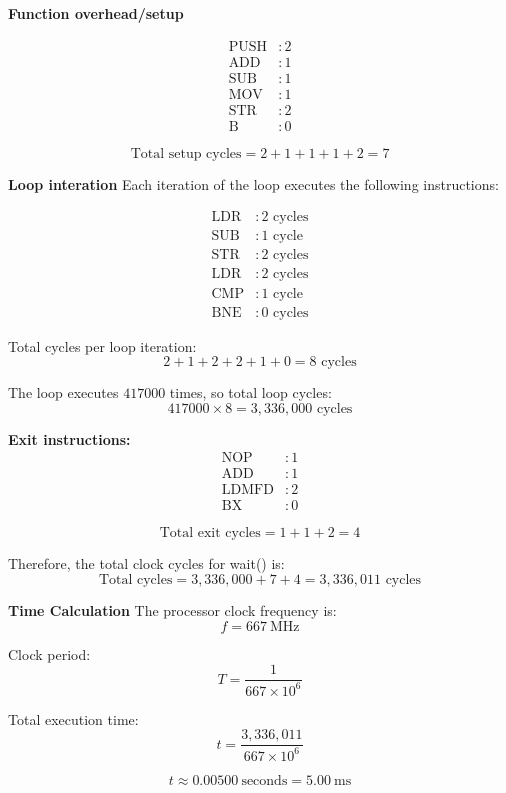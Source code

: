 \documentclass[10pt,twocolumn]{article}
\begin{document}
\textbf{Function overhead/setup}

\begin{align*}
\text{PUSH} &: 2 \\
\text{ADD}  &: 1 \\
\text{SUB}  &: 1 \\
\text{MOV}  &: 1 \\
\text{STR}  &: 2 \\
\text{B}    &: 0
\end{align*}

\[
\text{Total setup cycles} = 2 + 1 + 1 + 1 + 2 = 7
\]

\textbf{Loop interation}
Each iteration of the loop executes the following instructions:

\begin{align*}
\text{LDR} &: 2 \text{ cycles} \\
\text{SUB} &: 1 \text{ cycle} \\
\text{STR} &: 2 \text{ cycles} \\
\text{LDR} &: 2 \text{ cycles} \\
\text{CMP} &: 1 \text{ cycle} \\
\text{BNE} &: 0 \text{ cycles}
\end{align*}

\noindent Total cycles per loop iteration:
\[
2 + 1 + 2 + 2 + 1 + 0 = 8 \text{ cycles}
\]

\noindent The loop executes $417000$ times, so total loop cycles:
\[
417000 \times 8 = 3,336,000 \text{ cycles}
\]

\textbf{Exit instructions:}
\begin{align*}
\text{NOP}   &: 1 \\
\text{ADD}   &: 1 \\
\text{LDMFD} &: 2 \\
\text{BX}    &: 0
\end{align*}

\[
\text{Total exit cycles} = 1 + 1 + 2 = 4
\]

Therefore, the total clock cycles for wait() is:
\[
\text{Total cycles} = 3,336,000 + 7 + 4 = 3,336,011 \text{ cycles}
\]

\textbf{Time Calculation}
The processor clock frequency is:
\[
f = 667\ \text{MHz}
\]

Clock period:
\[
T = \frac{1}{667 \times 10^6}
\]

Total execution time:
\[
t = \frac{3,336,011}{667 \times 10^6}
\]

\[
t \approx 0.00500\ \text{seconds} = 5.00\ \text{ms}
\]
\end{document}
